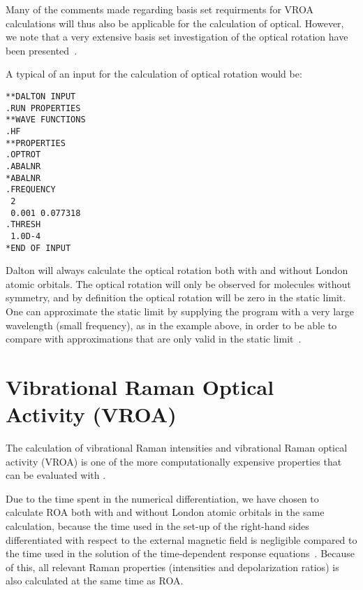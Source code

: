Many of the comments made regarding basis set requirments for VROA
calculations will thus also be applicable for the calculation of
optical. However, we note that a very extensive basis set
investigation of the optical rotation have been
presented~\cite{jrcmjffjdpjsjpca104}.

A typical of an input for the calculation of optical rotation would
be:

\begin{verbatim}
**DALTON INPUT
.RUN PROPERTIES
**WAVE FUNCTIONS
.HF
**PROPERTIES
.OPTROT
.ABALNR
*ABALNR
.FREQUENCY
 2
 0.001 0.077318
.THRESH
 1.0D-4
*END OF INPUT
\end{verbatim}

Dalton will always calculate the optical rotation both with and
without London atomic orbitals. The optical rotation will only be
observed for molecules without symmetry, and by definition the optical
rotation will be zero in the static limit. One can approximate the
static limit by supplying the program with a very large wavelength
(small frequency), as in the example above, in order to be able to
compare with approximations that are only valid in the static
limit~\cite{rdacpl87,jrcmjffjdpjsjpca104}. 

\section{Vibrational Raman Optical Activity (VROA)}\label{sec:vroa}

\begin{center}
\end{center}

The calculation of vibrational Raman intensities and vibrational Raman optical
activity (VROA) 
is one of the more computationally expensive properties that can be
evaluated with \siraba .

Due to the time spent in the numerical differentiation, we have chosen
to calculate ROA both with and without London atomic
orbitals in the
same calculation, because the time used in the set-up of the right-hand
sides differentiated
with respect to the external magnetic field is negligible compared to
the time used in the solution of the time-dependent response
equations~\cite{thkrklbpjjofd99}. Because of this,  all relevant Raman
properties (intensities and depolarization ratios) is also calculated
at the same time as ROA.  



